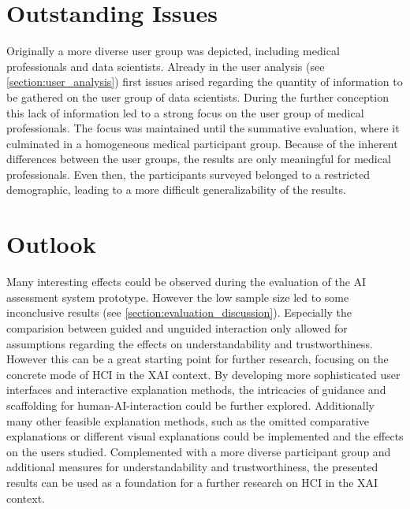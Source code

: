 \documentclass[11pt,a4paper,english]{scrreprt}
\begin{document}
\section{Outstanding Issues}
Originally a more diverse user group was depicted, including medical professionals and data scientists. Already in the user analysis (see \autoref{section:user_analysis}) first issues arised regarding the quantity of information to be gathered on the user group of data scientists. During the further conception this lack of information led to a strong focus on the user group of medical professionals. The focus was maintained until the summative evaluation, where it culminated in a homogeneous medical participant group. Because of the inherent differences between the user groups, the results are only meaningful for medical professionals. Even then, the participants surveyed belonged to a restricted demographic, leading to a more difficult generalizability of the results.

\section{Outlook}
Many interesting effects could be observed during the evaluation of the AI assessment system prototype. However the low sample size led to some inconclusive results (see \autoref{section:evaluation_discussion}). Especially the comparision between guided and unguided interaction only allowed for assumptions regarding the effects on understandability and trustworthiness. However this can be a great starting point for further research, focusing on the concrete mode of HCI in the XAI context. By developing more sophisticated user interfaces and interactive explanation methods, the intricacies of guidance and scaffolding for human-AI-interaction could be further explored. Additionally many other feasible explanation methods, such as the omitted comparative explanations or different visual explanations could be implemented and the effects on the users studied. Complemented with a more diverse participant group and additional measures for understandability and trustworthiness, the presented results can be used as a foundation for a further research on HCI in the XAI context.
\end{document}

